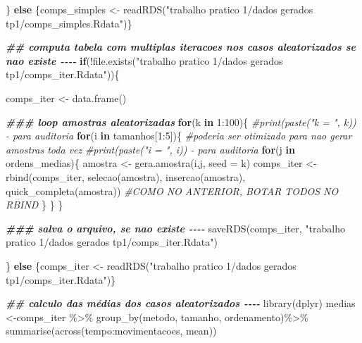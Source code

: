 \documentclass[
]{article}
\newenvironment{Shaded}{\begin{snugshade}}{\end{snugshade}}
\newcommand{\AttributeTok}[1]{\textcolor[rgb]{0.77,0.63,0.00}{#1}}
\newcommand{\CommentTok}[1]{\textcolor[rgb]{0.56,0.35,0.01}{\textit{#1}}}
\newcommand{\ControlFlowTok}[1]{\textcolor[rgb]{0.13,0.29,0.53}{\textbf{#1}}}
\newcommand{\DecValTok}[1]{\textcolor[rgb]{0.00,0.00,0.81}{#1}}
\newcommand{\DocumentationTok}[1]{\textcolor[rgb]{0.56,0.35,0.01}{\textbf{\textit{#1}}}}
\newcommand{\FunctionTok}[1]{\textcolor[rgb]{0.00,0.00,0.00}{#1}}
\newcommand{\NormalTok}[1]{#1}
\newcommand{\OtherTok}[1]{\textcolor[rgb]{0.56,0.35,0.01}{#1}}
\newcommand{\SpecialCharTok}[1]{\textcolor[rgb]{0.00,0.00,0.00}{#1}}
\newcommand{\StringTok}[1]{\textcolor[rgb]{0.31,0.60,0.02}{#1}}
\begin{document}
\begin{Shaded}
\begin{Highlighting}[]
\NormalTok{\} }\ControlFlowTok{else}\NormalTok{ \{comps\_simples }\OtherTok{\textless{}{-}} \FunctionTok{readRDS}\NormalTok{(}\StringTok{"trabalho pratico 1/dados gerados tp1/comps\_simples.Rdata"}\NormalTok{)\}}

\DocumentationTok{\#\# computa tabela com multiplas iteracoes nos casos aleatorizados se nao existe {-}{-}{-}{-}}
\ControlFlowTok{if}\NormalTok{(}\SpecialCharTok{!}\FunctionTok{file.exists}\NormalTok{(}\StringTok{"trabalho pratico 1/dados gerados tp1/comps\_iter.Rdata"}\NormalTok{))\{}

\NormalTok{  comps\_iter }\OtherTok{\textless{}{-}} \FunctionTok{data.frame}\NormalTok{()}
  
  \DocumentationTok{\#\#\# loop amostras aleatorizadas}
  \ControlFlowTok{for}\NormalTok{(k }\ControlFlowTok{in} \DecValTok{1}\SpecialCharTok{:}\DecValTok{100}\NormalTok{)\{}
    \CommentTok{\#print(paste("k = ", k)) {-} para auditoria}
    \ControlFlowTok{for}\NormalTok{(i }\ControlFlowTok{in}\NormalTok{ tamanhos[}\DecValTok{1}\SpecialCharTok{:}\DecValTok{5}\NormalTok{])\{ }\CommentTok{\#poderia ser otimizado para nao gerar amostras toda vez}
      \CommentTok{\#print(paste("i = ", i)) {-} para auditoria}
      \ControlFlowTok{for}\NormalTok{(j }\ControlFlowTok{in}\NormalTok{ ordens\_medias)\{}
\NormalTok{        amostra }\OtherTok{\textless{}{-}} \FunctionTok{gera.amostra}\NormalTok{(i,j, }\AttributeTok{seed =}\NormalTok{ k)}
\NormalTok{        comps\_iter }\OtherTok{\textless{}{-}} \FunctionTok{rbind}\NormalTok{(comps\_iter, }\FunctionTok{selecao}\NormalTok{(amostra), }
                            \FunctionTok{insercao}\NormalTok{(amostra), }\FunctionTok{quick\_completa}\NormalTok{(amostra))}
        \CommentTok{\#COMO NO ANTERIOR, BOTAR TODOS NO RBIND}
\NormalTok{      \}}
\NormalTok{    \}}
\NormalTok{  \}}
  

  
  \DocumentationTok{\#\#\# salva o arquivo, se nao existe {-}{-}{-}{-}}
  \FunctionTok{saveRDS}\NormalTok{(comps\_iter, }\StringTok{"trabalho pratico 1/dados gerados tp1/comps\_iter.Rdata"}\NormalTok{)}

\NormalTok{\} }\ControlFlowTok{else}\NormalTok{ \{comps\_iter }\OtherTok{\textless{}{-}} \FunctionTok{readRDS}\NormalTok{(}\StringTok{"trabalho pratico 1/dados gerados tp1/comps\_iter.Rdata"}\NormalTok{)\}}

\DocumentationTok{\#\# calculo das médias dos casos aleatorizados {-}{-}{-}{-}}
\FunctionTok{library}\NormalTok{(dplyr)}
\NormalTok{medias }\OtherTok{\textless{}{-}}\NormalTok{comps\_iter }\SpecialCharTok{\%\textgreater{}\%}
  \FunctionTok{group\_by}\NormalTok{(metodo, tamanho, ordenamento)}\SpecialCharTok{\%\textgreater{}\%}
  \FunctionTok{summarise}\NormalTok{(}\FunctionTok{across}\NormalTok{(tempo}\SpecialCharTok{:}\NormalTok{movimentacoes, mean))}


\end{Highlighting}
\end{Shaded}
\end{document}
